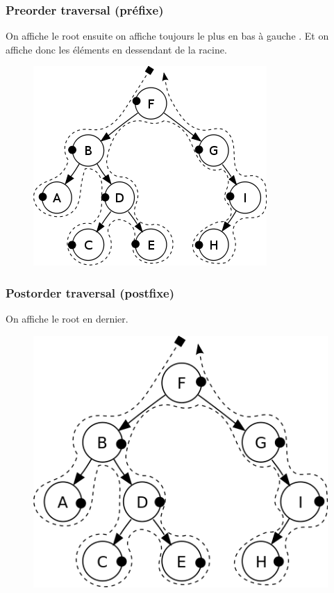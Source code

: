 \documentclass[a4paper]{article}
\begin{document}
\subsubsection{Preorder traversal (préfixe)}
On affiche le root ensuite on affiche toujours le plus en bas à gauche . Et on affiche donc les éléments en dessendant de la racine.
\begin{figure}[!h]
\begin{center}
\includegraphics[scale=0.4]{preorder.png}
\end{center}
\end{figure}
\subsubsection{Postorder traversal (postfixe)}
On affiche le root en dernier. 
\begin{figure}[!h]
\begin{center}
\includegraphics[scale=0.4]{postorder.png}
\end{center}
\end{figure}
\end{document}
